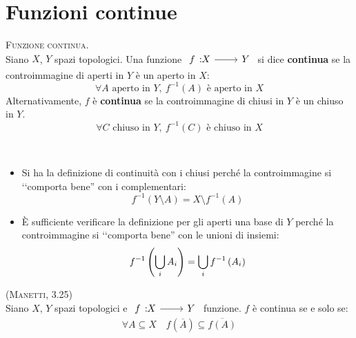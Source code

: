 \section{Funzioni continue}
\begin{define}\textsc{Funzione continua.}\\
Siano $X$, $Y$ spazi topologici. Una funzione $\funz{f}{X}{Y}$ si dice \textbf{continua} se la controimmagine di aperti in $Y$ è un aperto in $X$:
\begin{equation}
\forall A\text{ aperto in } Y,\ f^{-1}\left(A\right) \text{ è aperto in } X
\end{equation}
Alternativamente, $f$ è \textbf{continua} se la controimmagine di chiusi in $Y$ è un chiuso in $Y$.
\begin{equation}
	\forall C\text{ chiuso in } Y,\ f^{-1}\left(C\right) \text{ è chiuso in } X
\end{equation}
\vspace{-6mm}
\end{define}
\begin{observes}~{}
\begin{itemize}
\item Si ha la definizione di continuità con i chiusi perché la controimmagine si ‘‘comporta bene'' con i complementari:
\begin{equation*}
f^{-1}\left(Y\setminus A\right)=X\setminus f^{-1}\left(A\right)
\end{equation*}
\item È sufficiente verificare la definizione per gli aperti una base di $Y$ perché la controimmagine si ‘‘comporta bene'' con le unioni di insiemi:
\begin{equation*}
f^{-1}\left(\mathop{{\bigcup}}\displaylimits_{i}A_i\right)=\mathop{{\bigcup}}\displaylimits_{i}f^{-1}\left(A_i\right)
\end{equation*}
\end{itemize}
\vspace{-3mm}
\end{observes}
\begin{lemming}\textsc{(Manetti, 3.25)}\\
Siano $X$, $Y$ spazi topologici e $\funz{f}{X}{Y}$ funzione.
$f$ è continua se e solo se:
\begin{equation}
	\forall A\subseteq X\quad f\left(\overline{A}\right)\subseteq\overline{f\left(A\right)}
\end{equation}
\vspace{-6mm}
\end{lemming}
